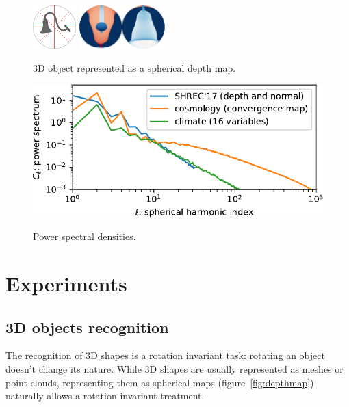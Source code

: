 \documentclass{article} %
\newcommand{\todo}[1]{{\color[rgb]{.6,.1,.6}{#1}}}
\newcommand{\figref}[1]{figure~\ref{fig:#1}}
\begin{document}
\begin{figure}
\begin{minipage}{0.35\linewidth}
		\includegraphics[height=4.5em]{lamp_000018}
		\hfill
		\includegraphics[height=4.5em]{lamp_000018_sphere_nobar}
		\caption{3D object represented as a spherical depth map.}
		\label{fig:depthmap}
		\vspace{1em}
		\includegraphics[width=\linewidth]{spectrum}
		\caption{Power spectral densities.}
		\label{fig:spectrum}
	\end{minipage}
\vspace{-0.5cm}
\end{figure}

\section{Experiments}


\subsection{3D objects recognition} \label{sec:exp:shrec}

The recognition of 3D shapes is a rotation invariant task: rotating an object doesn't change its nature.
While 3D shapes are usually represented as meshes or point clouds, representing them as spherical maps (\figref{depthmap}) naturally allows a rotation invariant treatment.
\end{document}
